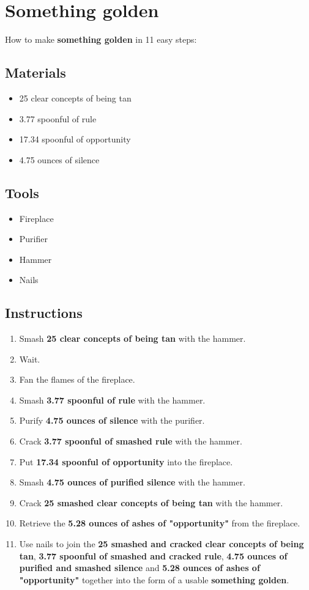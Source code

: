 \documentclass{article}
\begin{document}
\section{Something golden}How to make \textbf{something golden} in 11 easy steps:

\subsection{Materials}\begin{itemize}
\item 
25 clear concepts of being tan
\item 
3.77 spoonful of rule
\item 
17.34 spoonful of opportunity
\item 
4.75 ounces of silence
\end{itemize}
\subsection{Tools}\begin{itemize}
\item 
Fireplace
\item 
Purifier
\item 
Hammer
\item 
Nails
\end{itemize}
\subsection{Instructions}\begin{enumerate}
\item 
Smash \textbf{25 clear concepts of being tan} with the hammer.
\item 
Wait.
\item 
Fan the flames of the fireplace.
\item 
Smash \textbf{3.77 spoonful of rule} with the hammer.
\item 
Purify \textbf{4.75 ounces of silence} with the purifier.
\item 
Crack \textbf{3.77 spoonful of smashed rule} with the hammer.
\item 
Put \textbf{17.34 spoonful of opportunity} into the fireplace.
\item 
Smash \textbf{4.75 ounces of purified silence} with the hammer.
\item 
Crack \textbf{25 smashed clear concepts of being tan} with the hammer.
\item 
Retrieve the \textbf{5.28 ounces of ashes of "opportunity"} from the fireplace.
\item 
Use nails to join the \textbf{25 smashed and cracked clear concepts of being tan}, \textbf{3.77 spoonful of smashed and cracked rule}, \textbf{4.75 ounces of purified and smashed silence} and \textbf{5.28 ounces of ashes of "opportunity"} together into the form of a usable \textbf{something golden}.
\end{enumerate}
\newpage
\end{document}
